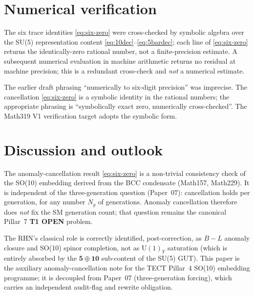 \section{Numerical verification}\label{sec:num}
The six trace identities \eqref{eq:six-zero} were cross-checked by
symbolic algebra over the SU(5) representation content
\eqref{eq:10dec}--\eqref{eq:5bardec}; each line of \eqref{eq:six-zero}
returns the identically-zero rational number, not a finite-precision
estimate. A subsequent numerical evaluation in machine arithmetic
returns no residual at machine precision; this is a redundant
cross-check and \emph{not} a numerical estimate.

\begin{remark}\label{rmk:symbolic}
The earlier draft phrasing ``numerically to six-digit precision'' was
imprecise. The cancellation \eqref{eq:six-zero} is a symbolic identity
in the rational numbers; the appropriate phrasing is ``symbolically
exact zero, numerically cross-checked''. The Math319 V1 verification
target adopts the symbolic form.
\end{remark}

\section{Discussion and outlook}\label{sec:discussion}
The anomaly-cancellation result \eqref{eq:six-zero} is a non-trivial
consistency check of the SO(10) embedding derived from the BCC
condensate (Math157, Math229). It is independent of the
three-generation question (Paper~07): cancellation holds per
generation, for any number $N_g$ of generations. Anomaly cancellation
therefore does \emph{not} fix the SM generation count; that question
remains the canonical Pillar~7 \textbf{T1 OPEN} problem.

The RHN's classical role is correctly identified, post-correction, as
$B-L$ anomaly closure and SO(10) spinor completion, not as
$\mathrm{U}(1)_Y$ saturation (which is entirely absorbed by the
$\overline{\mathbf{5}}\oplus\mathbf{10}$ sub-content of the SU(5)
GUT). This paper is the auxiliary anomaly-cancellation note for the
TECT Pillar~4 SO(10) embedding programme; it is decoupled from
Paper~07 (three-generation forcing), which carries an independent
audit-flag and rewrite obligation.

